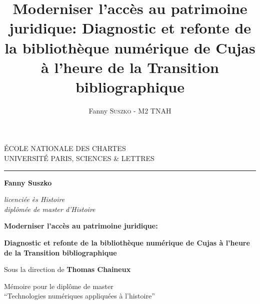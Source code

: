 \documentclass[12pt,twoside]{book}
\author{Fanny \textsc{Suszko} - M2 TNAH}
\title{Moderniser l'accès au patrimoine juridique: Diagnostic et refonte de la bibliothèque numérique de Cujas à l'heure de la Transition bibliographique}
\begin{document}
	\begin{titlepage}
		\begin{center}
			
			\bigskip
			
			\begin{large}				
				ÉCOLE NATIONALE DES CHARTES\\
				UNIVERSITÉ PARIS, SCIENCES \& LETTRES
			\end{large}
			\begin{center}\rule{2cm}{0.02cm}\end{center}
			
			\bigskip
			\bigskip
			\bigskip
			\begin{Large}
				\textbf{Fanny Suszko}\\
			\end{Large}
			\begin{normalsize} \textit{licenciée ès Histoire}\\
				\textit{diplômée de master d'Histoire}
			\end{normalsize}
			
			\bigskip
			\bigskip
			\bigskip
			
			\begin{Huge}
				\textbf{Moderniser l’accès au patrimoine juridique: }\\
			\end{Huge}
			\bigskip
			\bigskip
			\begin{LARGE}
				\textbf{Diagnostic et refonte de la bibliothèque numérique de Cujas à l'heure de la Transition bibliographique}\\
			\end{LARGE}
			
			\bigskip
			\bigskip
			\bigskip
			\begin{large}
				Sous la direction de \textbf{Thomas Chaineux}
			\end{large}
			\vfill
			
			\begin{large}
				Mémoire 
				pour le diplôme de master \\
				\enquote{Technologies numériques appliquées à l'histoire} \\
			\end{large}
			
		\end{center}
	\end{titlepage}

	\thispagestyle{empty}	
	\cleardoublepage
	
\end{document}
